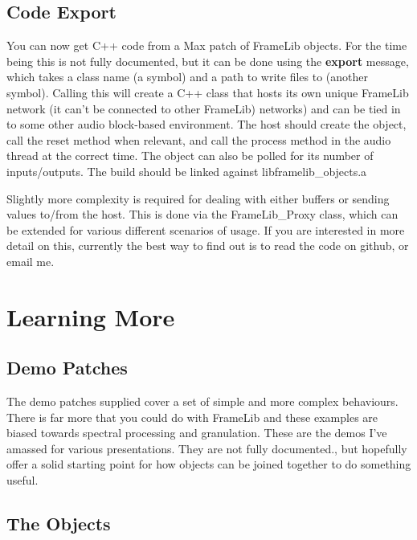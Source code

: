\documentclass{article}
\begin{document}
\subsection{Code Export}

You can now get C++ code from a Max patch of FrameLib objects. For the time being this is not fully documented, but it can be done using the \textbf{export} message, which takes a class name (a symbol) and a path to write files to (another symbol). Calling this will create a C++ class that hosts its own unique FrameLib network (it can't be connected to other FrameLib) networks) and can be tied in to some other audio block-based environment. The host should create the object, call the reset method when relevant, and call the process method in the audio thread at the correct time. The object can also be polled for its number of inputs/outputs. The build should be linked against libframelib\_objects.a

Slightly more complexity is required for dealing with either buffers or sending values to/from the host. This is done via the FrameLib\_Proxy class, which can be extended for various different scenarios of usage. If you are interested in more detail on this, currently the best way to find out is to read the code on github, or email me. 



\section{Learning More}
\vspace{0.1in}

\subsection{Demo Patches}

The demo patches supplied cover a set of simple and more complex behaviours. There is far more that you could do with FrameLib and these examples are biased towards spectral processing and granulation. These are the demos I've amassed for various presentations. They are not fully documented., but hopefully offer a solid starting point for how objects can be joined together to do something useful.

\subsection{The Objects}
\end{document}
